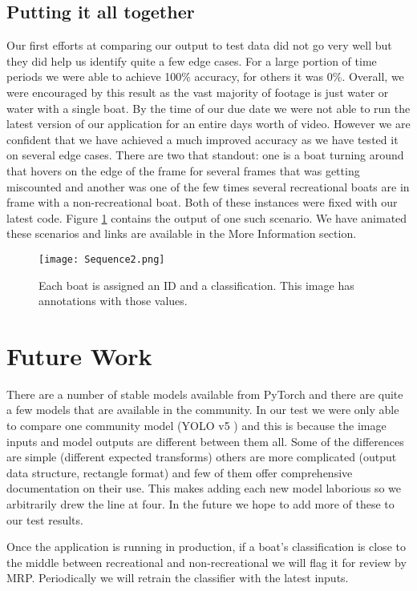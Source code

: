 \documentclass[10pt,twocolumn,letterpaper]{article}
\begin{document}
\subsection{Putting it all together}

Our first efforts at comparing our output to test data did not go very well but they did help us identify quite a few edge cases. For a large portion of time periods we were able to achieve 100\% accuracy, for others it was 0\%. Overall, we were encouraged by this result as the vast majority of footage is just water or water with a single boat. By the time of our due date we were not able to run the latest version of our application for an entire days worth of video. However we are confident that we have achieved a much improved accuracy as we have tested it on several edge cases. There are two that standout: one is a boat turning around that hovers on the edge of the frame for several frames that was getting miscounted and another was one of the few times several recreational boats are in frame with a non-recreational boat. Both of these instances were fixed with our latest code. Figure \ref{fig:sequence} contains the output of one such scenario. We have animated these scenarios and links are available in the More Information section. 

\begin{figure}
 \center
  \texttt{[image: Sequence2.png]}
  \caption{Each boat is assigned an ID and a classification. This image has annotations with those values.}
  \label{fig:sequence}
\end{figure}

\section{Future Work}

There are a number of stable models available from PyTorch and there are quite a few models that are available in the community. In our test we were only able to compare one community model (YOLO v5 \cite{pytorch_yolov5}) and this is because the image inputs and model outputs are different between them all. Some of the differences are simple (different expected transforms) others are more complicated (output data structure, rectangle format) and few of them offer comprehensive documentation on their use. This makes adding each new model laborious so we arbitrarily drew the line at four. In the future we hope to add more of these to our test results.

Once the application is running in production, if a boat's classification is close to the middle between recreational and non-recreational we will flag it for review by MRP. Periodically we will retrain the classifier with the latest inputs.
\end{document}
